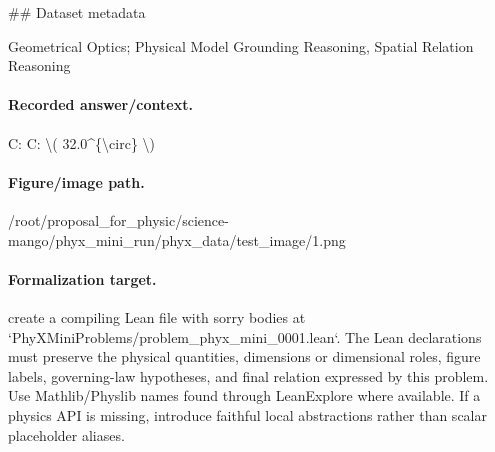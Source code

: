 \#\# Dataset metadata

Geometrical Optics; Physical Model Grounding Reasoning, Spatial Relation Reasoning

\paragraph{Recorded answer/context.}
C: C: \textbackslash{}( 32.0\textasciicircum{}\{\textbackslash{}circ\} \textbackslash{})

\paragraph{Figure/image path.}
/root/proposal\_for\_physic/science-mango/phyx\_mini\_run/phyx\_data/test\_image/1.png

\paragraph{Formalization target.}
create a compiling Lean file with sorry bodies at `PhyXMiniProblems/problem\_phyx\_mini\_0001.lean`. The Lean declarations must preserve the physical quantities, dimensions or dimensional roles, figure labels, governing-law hypotheses, and final relation expressed by this problem.
Use Mathlib/Physlib names found through LeanExplore where available. If a physics API is missing, introduce faithful local abstractions rather than scalar placeholder aliases.


